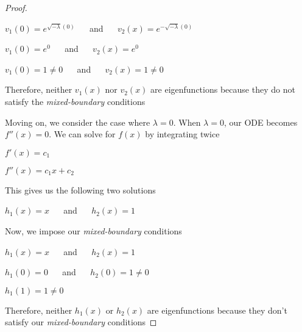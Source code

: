 \documentclass[executivepaper]{article}
\begin{document}
\begin{flushleft}
\begin{proof}
\begin{center}
\vspace{2mm}

$v_{1}(0)=e^{\sqrt{-\lambda} (0)}$ $\quad$ and $\quad$ $v_{2}(x)=e^{-\sqrt{-\lambda} (0)}$

\vspace{2mm}

$v_{1}(0)=e^{0}$ $\quad$ and $\quad$ $v_{2}(x)=e^{0}$

\vspace{2mm}

$v_{1}(0)=1 \neq 0$ $\quad$ and $\quad$ $v_{2}(x)=1 \neq 0$

\end{center}

Therefore, neither $v_{1}(x)$ nor $v_{2}(x)$ are eigenfunctions because they do not satisfy the \textit{mixed-boundary} conditions

\vspace{5mm}

Moving on, we consider the case where $\lambda=0$. When $\lambda=0$, our ODE becomes $f''(x)=0$. We can solve for $f(x)$ by integrating twice

\begin{center}

$f'(x)=c_{1}$

$f''(x)=c_{1}x+c_{2}$

\end{center}

This gives us the following two solutions

\begin{center}

$h_{1}(x)=x$ $\quad$ and $\quad$ $h_{2}(x)=1$

\end{center}

Now, we impose our \textit{mixed-boundary} conditions

\begin{center}

$h_{1}(x)=x$ $\quad$ and $\quad$ $h_{2}(x)=1$

\vspace{2mm}

$h_{1}(0)=0$ $\quad$ and $\quad$ $h_{2}(0)=1 \neq 0$

\vspace{2mm}

$h_{1}(1)=1 \neq 0$

\end{center}

Therefore, neither $h_{1}(x)$ or $h_{2}(x)$ are eigenfunctions because they don't satisfy our \textit{mixed-boundary} conditions


\end{proof}
\end{flushleft}
\end{document}
